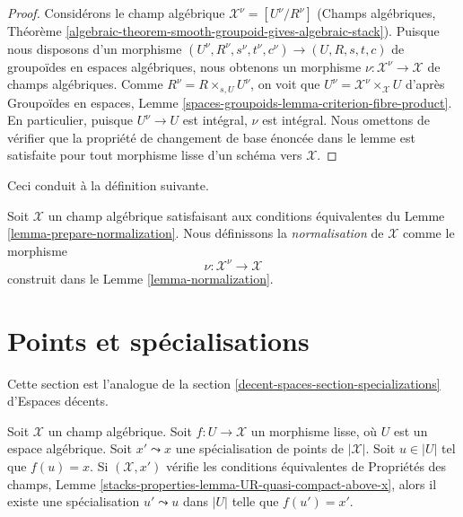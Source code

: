 \begin{proof}
\medskip\noindent
Considérons le champ algébrique $\mathcal{X}^\nu = [U^\nu/R^\nu]$
(Champs algébriques, Théorème
\ref{algebraic-theorem-smooth-groupoid-gives-algebraic-stack}).
Puisque nous disposons d'un morphisme
$(U^\nu, R^\nu, s^\nu, t^\nu, c^\nu) \to (U, R, s, t, c)$
de groupoïdes en espaces algébriques, nous obtenons un morphisme
$\nu : \mathcal{X}^\nu \to \mathcal{X}$ de champs algébriques.
Comme $R^\nu = R \times_{s, U} U^\nu$, on voit que
$U^\nu = \mathcal{X}^\nu \times_\mathcal{X} U$ d'après
Groupoïdes en espaces, Lemme
\ref{spaces-groupoids-lemma-criterion-fibre-product}.
En particulier, puisque $U^\nu \to U$ est intégral, $\nu$ est intégral.
Nous omettons de vérifier que la propriété de changement de base
énoncée dans le lemme est satisfaite pour tout morphisme lisse d'un schéma vers
$\mathcal{X}$.
\end{proof}

\noindent
Ceci conduit à la définition suivante.

\begin{definition}
\label{definition-normalization}
Soit $\mathcal{X}$ un champ algébrique satisfaisant aux
conditions équivalentes du Lemme \ref{lemma-prepare-normalization}.
Nous définissons la {\it normalisation} de $\mathcal{X}$ comme le morphisme
$$
\nu : \mathcal{X}^\nu \longrightarrow \mathcal{X}
$$
construit dans le Lemme \ref{lemma-normalization}.
\end{definition}
 
  
   
    
     
      




\section{Points et spécialisations}
\label{section-specializations}

\noindent
Cette section est l'analogue de la section
\ref{decent-spaces-section-specializations} d'Espaces décents.

\begin{lemma}
\label{lemma-specialization}
Soit $\mathcal{X}$ un champ algébrique. Soit $f : U \to \mathcal{X}$
un morphisme lisse, où $U$ est un espace algébrique. Soit
$x' \leadsto x$ une spécialisation de points de $|\mathcal{X}|$.
Soit $u \in |U|$ tel que $f(u) = x$. Si $(\mathcal{X}, x')$ vérifie les
conditions équivalentes de Propriétés des champs,
Lemme \ref{stacks-properties-lemma-UR-quasi-compact-above-x},
alors il existe une spécialisation
$u' \leadsto u$ dans $|U|$ telle que $f(u') = x'$.
\end{lemma}

